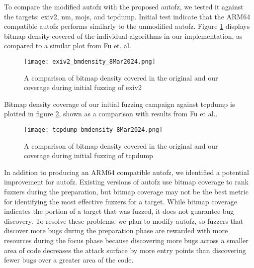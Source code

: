To compare the  modified autofz with the proposed autofz, we tested it against the targets: exiv2, 
nm, mojs, and tcpdump. Initial test indicate that the ARM64 compatible autofz performs similarly to 
the unmodified autofz. Figure \ref{fig:exiv2_bmdensity_8Mar2024} displays bitmap density covered of 
the individual algorithms in our implementation, as compared to a similar plot from Fu et. al\cite{Fu}.

\begin{figure}
    \texttt{[image: exiv2\_bmdensity\_8Mar2024.png]}
    \centering
    \caption{A comparison of bitmap density covered in the original\cite{Fu} and our coverage during
     initial fuzzing of exiv2}
    \label{fig:exiv2_bmdensity_8Mar2024}
\end{figure}

Bitmap density coverage of our initial fuzzing campaign against tcpdump is plotted in figure 
\ref{fig:tcpdump_bmdensity_8Mar2024}, shown as a comparison with results from Fu et al.\cite{Fu}.


\begin{figure}
    \texttt{[image: tcpdump\_bmdensity\_8Mar2024.png]}
    \centering
    \caption{A comparison of bitmap density covered in the original\cite{Fu} and our coverage during initial fuzzing of tcpdump}
    \label{fig:tcpdump_bmdensity_8Mar2024}
\end{figure}

In addition to producing an ARM64 compatible autofz, we identified a potential improvement for autofz. 
Existing versions of autofz use bitmap coverage to rank fuzzers during the preparation, but bitmap 
coverage may not be the best metric for identifying the most effective fuzzers for a target. While 
bitmap coverage indicates the portion of a target that was fuzzed, it does not guarantee bug discovery. 
To resolve these problems, we plan to modify autofz, so fuzzers that discover more bugs during the 
preparation phase are rewarded with more resources during the focus phase because discovering more bugs 
across a smaller area of code decreases the attack surface by more entry points than discovering fewer 
bugs over a greater area of the code.


    





